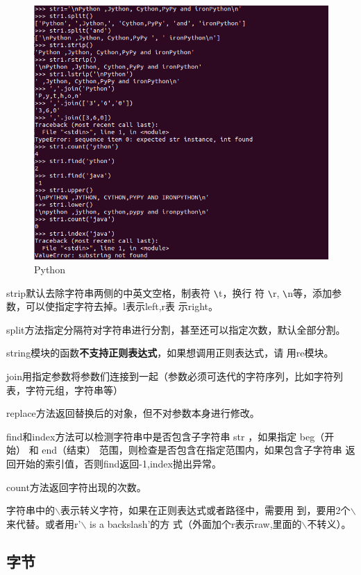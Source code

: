 \documentclass[11pt,UTF8,oneside]{mybook}
\begin{document}
\begin{figure}[htb]
  \centering \includegraphics[width=\textwidth]{./figure/string.png}
  \caption{Python}
  \label{fig:string}
\end{figure}

strip默认去除字符串两侧的中英文空格，制表符 \verb|\|t，换行
符 \verb|\|r, \verb|\|n等，添加参数，可以使指定字符去掉。l表示left,r表
示right。

split方法指定分隔符对字符串进行分割，甚至还可以指定次数，默认全部分割。

string模块的函数\textbf{不支持正则表达式}，如果想调用正则表达式，请
用re模块。

join用指定参数将参数们连接到一起（参数必须可迭代的字符序列，比如字符列
表，字符元组，字符串等）

replace方法返回替换后的对象，但不对参数本身进行修改。

find和index方法可以检测字符串中是否包含子字符串 str ，如果指定 beg（开
始） 和 end（结束） 范围，则检查是否包含在指定范围内，如果包含子字符串
返回开始的索引值，否则find返回-1,index抛出异常。

count方法返回字符出现的次数。

字符串中的$\backslash$表示转义字符，如果在正则表达式或者路径中，需要用
到，要用2个$\backslash$来代替。或者用r'$\backslash$ is a backslash'的方
式（外面加个r表示raw,里面的$\backslash$不转义）。

\subsection{字节}
\label{sec:bytes}
\end{document}
